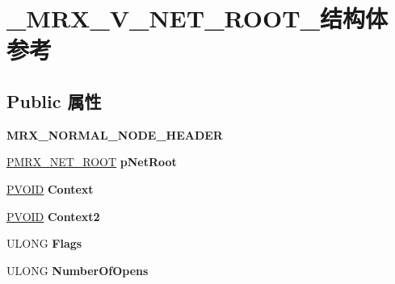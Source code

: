 \hypertarget{struct___m_r_x___v___n_e_t___r_o_o_t__}{}\section{\+\_\+\+M\+R\+X\+\_\+\+V\+\_\+\+N\+E\+T\+\_\+\+R\+O\+O\+T\+\_\+结构体 参考}
\label{struct___m_r_x___v___n_e_t___r_o_o_t__}
\subsection*{Public 属性}
\begin{DoxyCompactItemize}
\item 
\mbox{\label{struct___m_r_x___v___n_e_t___r_o_o_t___ac69615f20c2e4a42a5b4e9dbda14e63b}} 
{\bfseries M\+R\+X\+\_\+\+N\+O\+R\+M\+A\+L\+\_\+\+N\+O\+D\+E\+\_\+\+H\+E\+A\+D\+ER}
\item 
\mbox{\label{struct___m_r_x___v___n_e_t___r_o_o_t___aba163585c8622766ad5ba0c78b725dc3}} 
\hyperlink{struct___m_r_x___n_e_t___r_o_o_t__}{P\+M\+R\+X\+\_\+\+N\+E\+T\+\_\+\+R\+O\+OT} {\bfseries p\+Net\+Root}
\item 
\mbox{\label{struct___m_r_x___v___n_e_t___r_o_o_t___ae79811caa5271e5fd79f080f141ec86e}} 
\hyperlink{interfacevoid}{P\+V\+O\+ID} {\bfseries Context}
\item 
\mbox{\label{struct___m_r_x___v___n_e_t___r_o_o_t___a066bca8b2fdf5f9668d096dc58cd0c4f}} 
\hyperlink{interfacevoid}{P\+V\+O\+ID} {\bfseries Context2}
\item 
\mbox{\label{struct___m_r_x___v___n_e_t___r_o_o_t___a76a7839e29196682e213205fde4d5daf}} 
U\+L\+O\+NG {\bfseries Flags}
\item 
\mbox{\label{struct___m_r_x___v___n_e_t___r_o_o_t___a2fb9078e16ae4d65db8d86ddc6917ec8}} 
U\+L\+O\+NG {\bfseries Number\+Of\+Opens}
\item 
\mbox{\label{struct___m_r_x___v___n_e_t___r_o_o_t___a1a2d9a338196f07b55712b5962eea50d}} 

\end{DoxyCompactItemize}
